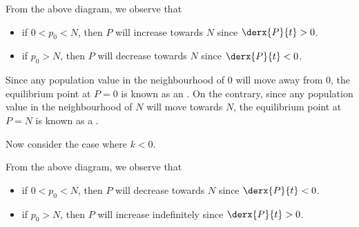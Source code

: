 From the above diagram, we observe that
\begin{itemize}
    \item if $0 < p_0 < N$, then $P$ will increase towards $N$ since $\derx{P}{t} > 0$.
    \item if $p_0 > N$, then $P$ will decrease towards $N$ since $\derx{P}{t} < 0$.
\end{itemize}

Since any population value in the neighbourhood of 0 will move away from 0, the equilibrium point at $P = 0$ is known as an . On the contrary, since any population value in the neighbourhood of $N$ will move towards $N$, the equilibrium point at $P = N$ is known as a .

Now consider the case where $k < 0$.

\begin{figure}[H]
    \centering
    \caption{}
\end{figure}

From the above diagram, we observe that
\begin{itemize}
    \item if $0 < p_0 < N$, then $P$ will decrease towards $N$ since $\derx{P}{t} < 0$.
    \item if $p_0 > N$, then $P$ will increase indefinitely since $\derx{P}{t} > 0$.
\end{itemize}

